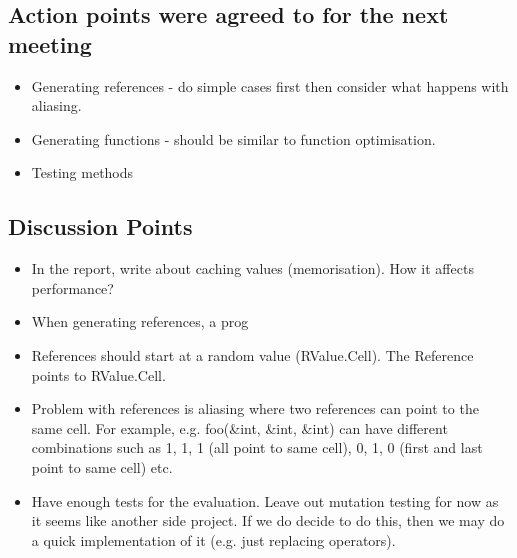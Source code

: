 \documentclass[]{article}
\begin{document}
\subsection{Action points were agreed to for the next meeting}
\begin{itemize}
	\item Generating references - do simple cases first then consider what happens with aliasing.
	\item Generating functions - should be similar to function optimisation.
	\item Testing methods
\end{itemize}

\subsection{Discussion Points}
\begin{itemize}
	\item In the report, write about caching values (memorisation). How it affects performance?
	\item When generating references, a prog
	\item References should start at a random value (RValue.Cell). The Reference points to RValue.Cell.
	\item Problem with references is aliasing where two references can point to the same cell.
	For example, e.g. foo(\&int, \&int, \&int) can have different combinations such as 1, 1, 1 (all point to same cell), 0, 1, 0 (first and last point to same cell) etc.
	\item Have enough tests for the evaluation. Leave out mutation testing for now as it seems like another side project. If we do decide to do this, then we may do a quick implementation of it (e.g. just replacing operators).
\end{itemize}
\end{document}
